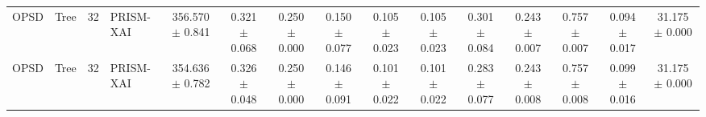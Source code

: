 \begin{table}[t]
\begin{tabular}{llllccccccccccc}
OPSD & Tree & 32 & PRISM-XAI & 356.570 $\pm$ 0.841 & 0.321 $\pm$ 0.068 & 0.250 $\pm$ 0.000 & 0.150 $\pm$ 0.077 & 0.105 $\pm$ 0.023 & 0.105 $\pm$ 0.023 & 0.301 $\pm$ 0.084 & 0.243 $\pm$ 0.007 & 0.757 $\pm$ 0.007 & 0.094 $\pm$ 0.017 & 31.175 $\pm$ 0.000 \\
OPSD & Tree & 32 & PRISM-XAI & 354.636 $\pm$ 0.782 & 0.326 $\pm$ 0.048 & 0.250 $\pm$ 0.000 & 0.146 $\pm$ 0.091 & 0.101 $\pm$ 0.022 & 0.101 $\pm$ 0.022 & 0.283 $\pm$ 0.077 & 0.243 $\pm$ 0.008 & 0.757 $\pm$ 0.008 & 0.099 $\pm$ 0.016 & 31.175 $\pm$ 0.000 \\
\bottomrule
\end{tabular}
\end{table}
